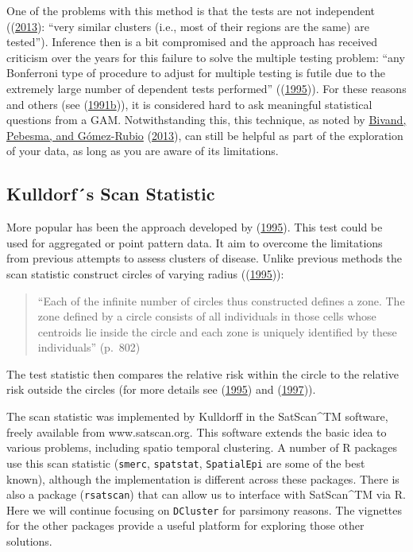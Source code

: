 \documentclass[
  krantz2]{krantz}
\begin{document}
One of the problems with this method is that the tests are not independent ((\protect\hyperlink{ref-Bivand_2013}{2013}): ``very similar clusters (i.e., most of their regions are the same) are tested''). Inference then is a bit compromised and the approach has received criticism over the years for this failure to solve the multiple testing problem: ``any Bonferroni type of procedure to adjust for multiple testing is
futile due to the extremely large number of dependent tests performed'' ((\protect\hyperlink{ref-Kulldorff_1995}{1995})). For these reasons and others (see (\protect\hyperlink{ref-Marshall_1991b}{1991b})), it is considered hard to ask meaningful statistical questions from a GAM. Notwithstanding this, this technique, as noted by \protect\hyperlink{ref-Bivand_2013}{Bivand, Pebesma, and Gómez-Rubio} (\protect\hyperlink{ref-Bivand_2013}{2013}), can still be helpful as part of the exploration of your data, as long as you are aware of its limitations.

\hypertarget{kulldorfs-scan-statistic}{%
\subsection{Kulldorf´s Scan Statistic}\label{kulldorfs-scan-statistic}}

More popular has been the approach developed by (\protect\hyperlink{ref-Kulldorff_1995}{1995}). This test could be used for aggregated or point pattern data. It aim to overcome the limitations from previous attempts to assess clusters of disease. Unlike previous methods the scan statistic construct circles of varying radius ((\protect\hyperlink{ref-Kulldorff_1995}{1995})):

\begin{quote}
``Each of the infinite number of circles thus constructed defines a zone.
The zone defined by a circle consists of all individuals in those cells whose centroids lie inside the circle and each zone is uniquely identified by these individuals'' (p.~802)
\end{quote}

The test statistic then compares the relative risk within the circle to the relative risk outside the circles (for more details see (\protect\hyperlink{ref-Kulldorff_1995}{1995}) and (\protect\hyperlink{ref-Kulldorff_1997}{1997})).

The scan statistic was implemented by Kulldorff in the SatScan\^{}TM software, freely available from www.satscan.org. This software extends the basic idea to various problems, including spatio temporal clustering. A number of R packages use this scan statistic (\texttt{smerc}, \texttt{spatstat}, \texttt{SpatialEpi} are some of the best known), although the implementation is different across these packages. There is also a package (\texttt{rsatscan}) that can allow us to interface with SatScan\^{}TM via R. Here we will continue focusing on \texttt{DCluster} for parsimony reasons. The vignettes for the other packages provide a useful platform for exploring those other solutions.
\end{document}

